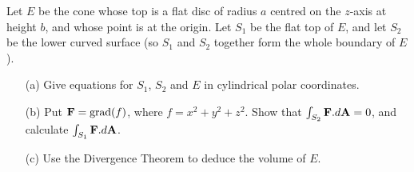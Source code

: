 \documentclass[a4paper]{amsart}
\begin{document}
\begin{exercise}
 Let $E$ be the cone whose top is a flat disc of radius $a$ centred on
 the $z$-axis at height $b$, and whose point is at the origin.  Let
 $S_1$ be the flat top of $E$, and let $S_2$ be the lower curved
 surface (so $S_1$ and $S_2$ together form the whole boundary of $E$).
 \begin{itemize}
  \item[(a)] Give equations for $S_1$, $S_2$ and $E$ in cylindrical
   polar coordinates.
  \item[(b)] Put $\mathbf{F}=\operatorname{grad}(f)$, where $f=x^2+y^2+z^2$.  Show that
   $\int_{S_2}\mathbf{F}.d\mathbf{A}=0$, and calculate $\int_{S_1}\mathbf{F}.d\mathbf{A}$.
  \item[(c)] Use the Divergence Theorem to deduce the volume of $E$.
 \end{itemize}
\end{exercise}
\end{document}
